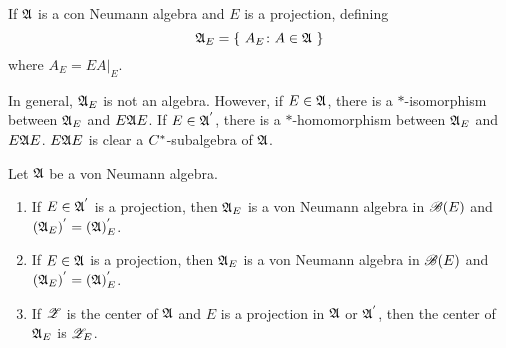 \documentclass[a4paper,11pt]{report}
\begin{document}
\begin{defn}
	If $\mathfrak{A}$ is a con Neumann algebra and $E$ is a projection, defining
	\begin{equation*}
		\mathfrak{A}_{E} = \{~A_E \colon A \in \mathfrak{A}~\}
	\end{equation*}
	where $A_E = EA|_E$.
\end{defn}
\begin{rem}
	In general, $\mathfrak{A}_E$ is not an algebra. However, if $E \in \mathfrak{A}$, there is a $*$-isomorphism between $\mathfrak{A}_E$ and $E\mathfrak{A} E$. If $E \in \mathfrak{A}^{'}$, there is a $*$-homomorphism between $\mathfrak{A}_E$ and $E\mathfrak{A} E$. $E \mathfrak{A} E$ is clear a $C^{*}$-subalgebra of $\mathfrak{A}$.
\end{rem}

\begin{prop}
	Let $\mathfrak{A}$ be a von Neumann algebra.
	\begin{enumerate}[label=\arabic*)]
		\item If $E \in \mathfrak{A}^{'}$ is a projection, then $\mathfrak{A}_E$ is a von Neumann algebra in $\mathscr{B}(E)$ and $(\mathfrak{A}_E)^{'} = (\mathfrak{A})^{'}_E$.
		\item If $E \in \mathfrak{A}$ is a projection, then $\mathfrak{A}_E$ is a von Neumann algebra in $\mathscr{B}(E)$ and $(\mathfrak{A}_E)^{'} = (\mathfrak{A})^{'}_E$.
		\item If $\mathscr{Z}$ is the center of $\mathfrak{A}$ and $E$ is a projection in $\mathfrak{A}$ or $\mathfrak{A}^{'}$, then the center of $\mathfrak{A}_E$ is $\mathscr{Z}_E$.
	\end{enumerate}
\end{prop}
\end{document}

